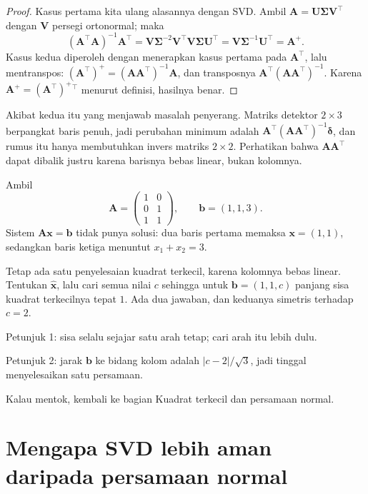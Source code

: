 \begin{proof}
Kasus pertama kita ulang alasannya dengan SVD. Ambil
$\mathbf{A}=\mathbf{U}\boldsymbol{\Sigma}\mathbf{V}^{\top}$ dengan $\mathbf{V}$ persegi
ortonormal; maka
\[
  (\mathbf{A}^{\top}\mathbf{A})^{-1}\mathbf{A}^{\top}
  =\mathbf{V}\boldsymbol{\Sigma}^{-2}\mathbf{V}^{\top}\mathbf{V}\boldsymbol{\Sigma}\mathbf{U}^{\top}
  =\mathbf{V}\boldsymbol{\Sigma}^{-1}\mathbf{U}^{\top}=\mathbf{A}^{+}.
\]
Kasus kedua diperoleh dengan menerapkan kasus pertama pada $\mathbf{A}^{\top}$, lalu
mentranspos: $(\mathbf{A}^{\top})^{+}=(\mathbf{A}\mathbf{A}^{\top})^{-1}\mathbf{A}$,
dan transposnya $\mathbf{A}^{\top}(\mathbf{A}\mathbf{A}^{\top})^{-1}$. Karena
$\mathbf{A}^{+}=(\mathbf{A}^{\top})^{+}{}^{\top}$ menurut definisi, hasilnya benar.
\end{proof}

Akibat kedua itu yang menjawab masalah penyerang. Matriks detektor $2\times3$ berpangkat
baris penuh, jadi perubahan minimum adalah
$\mathbf{A}^{\top}(\mathbf{A}\mathbf{A}^{\top})^{-1}\boldsymbol{\delta}$, dan rumus itu
hanya membutuhkan invers matriks $2\times2$. Perhatikan bahwa
$\mathbf{A}\mathbf{A}^{\top}$ dapat dibalik justru karena barisnya bebas linear, bukan
kolomnya.

\begin{tantangan}
Ambil
\[
  \mathbf{A}=\begin{pmatrix}1&0\\0&1\\1&1\end{pmatrix},\qquad \mathbf{b}=(1,1,3).
\]
Sistem $\mathbf{A}\mathbf{x}=\mathbf{b}$ tidak punya solusi: dua baris pertama memaksa
$\mathbf{x}=(1,1)$, sedangkan baris ketiga menuntut $x_{1}+x_{2}=3$.

Tetap ada satu penyelesaian kuadrat terkecil, karena kolomnya bebas linear. Tentukan $\hat{\mathbf{x}}$, lalu cari semua nilai $c$ sehingga untuk $\mathbf{b}=(1,1,c)$ panjang sisa kuadrat terkecilnya tepat $1$. Ada dua jawaban, dan keduanya simetris terhadap $c=2$.

Petunjuk 1: sisa selalu sejajar satu arah tetap; cari arah itu lebih dulu.

Petunjuk 2: jarak $\mathbf{b}$ ke bidang kolom adalah $|c-2|/\sqrt{3}$, jadi tinggal menyelesaikan satu persamaan.

Kalau mentok, kembali ke bagian Kuadrat terkecil dan persamaan normal.
\end{tantangan}

\section{Mengapa SVD lebih aman daripada persamaan normal}

